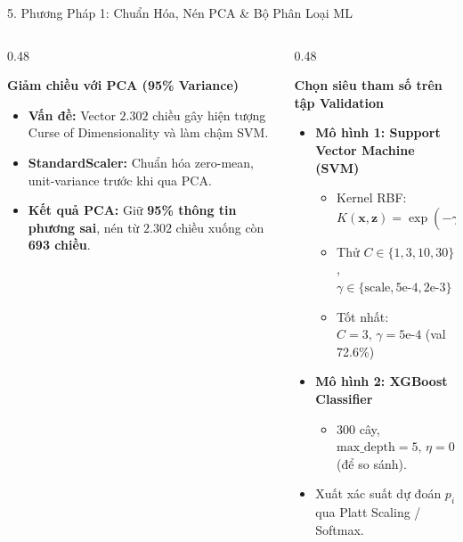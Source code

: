 \documentclass[aspectratio=169, 10pt]{beamer}
\begin{document}
\begin{frame}{5. Phương Pháp 1: Chuẩn Hóa, Nén PCA \& Bộ Phân Loại ML}
\begin{columns}[T]
  \begin{column}{0.48\textwidth}
    \begin{block}{\textbf{Giảm chiều với PCA (95\% Variance)}}
      \begin{itemize}
        \item \textbf{Vấn đề:} Vector $2.302$ chiều gây hiện tượng \alert{Curse of Dimensionality} và làm chậm SVM.
        \item \textbf{StandardScaler:} Chuẩn hóa zero-mean, unit-variance trước khi qua PCA.
        \item \textbf{Kết quả PCA:} Giữ \textbf{95\% thông tin phương sai}, nén từ $2.302$ chiều xuống còn \textbf{693 chiều}.
      \end{itemize}
    \end{block}
  \end{column}

  \begin{column}{0.48\textwidth}
    \begin{block}{\textbf{Chọn siêu tham số trên tập Validation}}
      \begin{itemize}
        \item \textbf{Mô hình 1: Support Vector Machine (SVM)}
        \begin{itemize}
          \item Kernel RBF: $K(\mathbf{x}, \mathbf{z}) = \exp(-\gamma \|\mathbf{x} - \mathbf{z}\|^2)$
          \item Thử $C \in \{1,3,10,30\}$, $\gamma \in \{\text{scale}, 5\text{e-}4, 2\text{e-}3\}$
          \item Tốt nhất: $C = 3, \, \gamma = 5\text{e-}4$ (val 72.6\%)
        \end{itemize}
        \item \textbf{Mô hình 2: XGBoost Classifier}
        \begin{itemize}
          \item 300 cây, $\text{max\_depth} = 5, \, \eta = 0.1$ (để so sánh).
        \end{itemize}
        \item Xuất xác suất dự đoán $p_i$ qua Platt Scaling / Softmax.
      \end{itemize}
    \end{block}
  \end{column}
\end{columns}
\end{frame}
\end{document}
